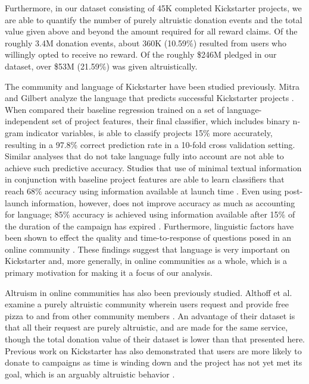 \documentclass[letterpaper]{article}
\begin{document}
Furthermore, in our dataset consisting of 45K completed Kickstarter projects, we are able to quantify the number of purely altruistic donation events and the total value given above and beyond the amount required for all reward claims. Of the roughly 3.4M donation events, about 360K (10.59\%) resulted from users who willingly opted to receive no reward. Of the roughly \$246M pledged in our dataset, over \$53M (21.59\%) was given altruistically.

The community and language of Kickstarter have been studied previously. Mitra and Gilbert analyze the language that predicts successful Kickstarter projects \cite{mitra2014language}. When compared their baseline regression trained on a set of language-independent set of project features, their final classifier, which includes binary n-gram indicator variables, is able to classify projects 15\% more accurately, resulting in a 97.8\% correct prediction rate in a 10-fold cross validation setting. Similar analyses that do not take language fully into account are not able to achieve such predictive accuracy. Studies that use of minimal textual information in conjunction with baseline project features are able to learn classifiers that reach 68\% accuracy using information available at launch time \cite{greenberg2013crowdfunding}. Even using post-launch information, however, does not improve accuracy as much as accounting for language; 85\% accuracy is achieved using information available after 15\% of the duration of the campaign has expired \cite{etter2013launch}. Furthermore, linguistic factors have been shown to effect the quality and time-to-response of questions posed in an online community \cite{teevan2011factors}. These findings suggest that language is very important on Kickstarter and, more generally, in online communities as a whole, which is a primary motivation for making it a focus of our analysis.

Altruism in online communities has also been previously studied. Althoff et al. examine a purely altruistic community wherein users request and provide free pizza to and from other community members \cite{althoff2014ask}. An advantage of their dataset is that all their request are purely altruistic, and are made for the same service, though the total donation value of their dataset is lower than that presented here. Previous work on Kickstarter has also demonstrated that users are more likely to donate to campaigns as time is winding down and the project has not yet met its goal, which is an arguably altruistic behavior \cite{kuppuswamy2013crowdfunding}.
\end{document}

